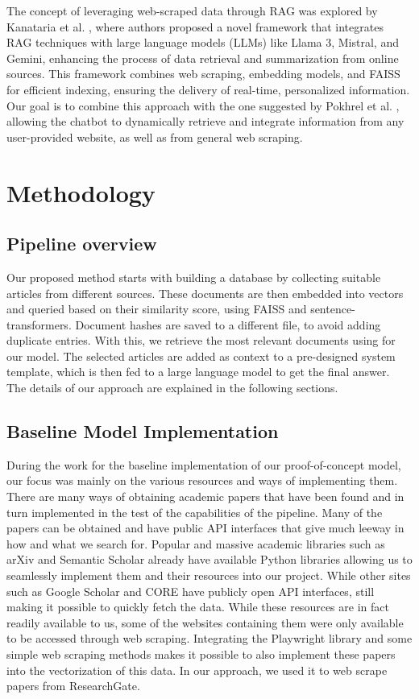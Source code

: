 \documentclass[fleqn,moreauthors,10pt]{ds_report}
\begin{document}
The concept of leveraging web-scraped data through RAG was explored by Kanataria et al. \cite{Kanataria2024}, where authors proposed a novel framework that integrates RAG techniques with large language models (LLMs) like Llama 3, Mistral, and Gemini, enhancing the process of data retrieval and summarization from online sources. This framework combines web scraping, embedding models, and FAISS for efficient indexing, ensuring the delivery of real-time, personalized information. Our goal is to combine this approach with the one suggested by  Pokhrel et al. \cite{Pokhrel2025}, allowing the chatbot to dynamically retrieve and integrate information from any user-provided website, as well as from general web scraping.

\section*{Methodology}

\subsection*{Pipeline overview}
Our proposed method starts with building a database by collecting suitable articles from different sources. These documents are then embedded into vectors and queried based on their similarity score, using FAISS \cite{douze2024faiss} and sentence-transformers. Document hashes are saved to a different file, to avoid adding duplicate entries. With this, we retrieve the most relevant documents using for our model. The selected articles are added as context to a pre-designed system template, which is then fed to a large language model to get the final answer. The details of our approach are explained in the following sections.

\subsection*{Baseline Model Implementation}
During the work for the baseline implementation of our proof-of-concept model, our focus was mainly on the various resources and ways of implementing them. There are many ways of obtaining academic papers that have been found and in turn implemented in the test of the capabilities of the pipeline. Many of the papers can be obtained and have public API interfaces that give much leeway in how and what we search for. Popular and massive academic libraries such as arXiv and Semantic Scholar already have available Python libraries allowing us to seamlessly implement them and their resources into our project. While other sites such as Google Scholar and CORE have publicly open API interfaces, still making it possible to quickly fetch the data. While these resources are in fact readily available to us, some of the websites containing them were only available to be accessed through web scraping. Integrating the Playwright library and some simple web scraping methods makes it possible to also implement these papers into the vectorization of this data. In our approach, we used it to web scrape papers from ResearchGate.
\end{document}
